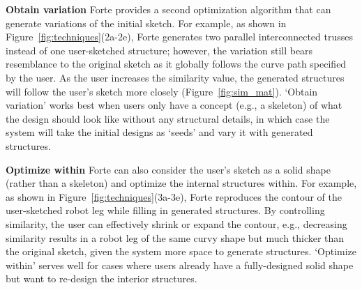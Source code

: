 \textbf{Obtain variation} \hspace{0.1cm} Forte provides a second optimization algorithm that can generate variations of the initial sketch. For example, as shown in Figure~\ref{fig:techniques}(2a-2e), Forte generates two parallel interconnected trusses instead of one user-sketched structure; however, the variation still bears resemblance to the original sketch as it globally follows the curve path specified by the user. As the user increases the similarity value, the generated structures will follow the user's sketch more closely (Figure~\ref{fig:sim_mat}). `Obtain variation' works best when users only have a concept (e.g., a skeleton) of what the design should look like without any structural details, in which case the system will take the initial designs as `seeds' and vary it with generated structures.


\textbf{Optimize within} \hspace{0.1cm} Forte can also consider the user's sketch as a solid shape (rather than a skeleton) and optimize the internal structures within. For example, as shown in Figure~\ref{fig:techniques}(3a-3e), Forte reproduces the contour of the user-sketched robot leg while filling in generated structures. By controlling similarity, the user can effectively shrink or expand the contour, e.g., decreasing similarity results in a robot leg of the same curvy shape but much thicker than the original sketch, given the system more space to generate structures. `Optimize within' serves well for cases where users already have a fully-designed solid shape but want to re-design the interior structures.

%

